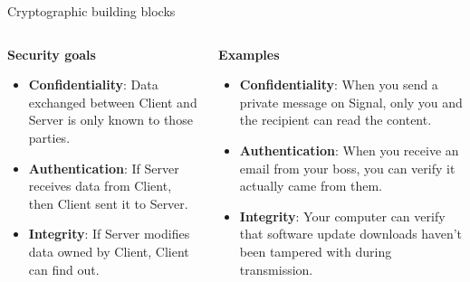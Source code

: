 \documentclass[aspectratio=169, lualatex, handout]{beamer}
\begin{document}
\begin{frame}{Cryptographic building blocks}
	\begin{columns}[c]
		\begin{column}{0.5\textwidth}
			\textbf{Security goals}
			\begin{itemize}
				\item \textbf{Confidentiality}: Data exchanged between Client and Server
				      is only known to those parties.

				\item \textbf{Authentication}: If Server receives data from Client,
				      then Client sent it to Server.

				\item \textbf{Integrity}: If Server modifies data owned by Client,
				      Client can find out.
			\end{itemize}
		\end{column}

		\begin{column}{0.5\textwidth}
			\textbf{Examples}
			\begin{itemize}
				\item \textbf{Confidentiality}: When you send a private message on Signal,
				      only you and the recipient can read the content.
				\item \textbf{Authentication}: When you receive an email from your boss,
				      you can verify it actually came from them.
				\item \textbf{Integrity}: Your computer can verify that software update
				      downloads haven't been tampered with during transmission.
			\end{itemize}
		\end{column}
	\end{columns}
\end{frame}
\end{document}
